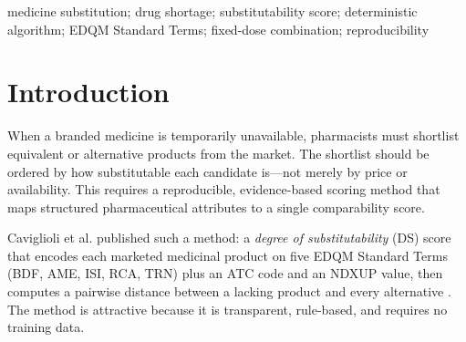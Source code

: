 \documentclass[a4paper]{elsarticle}
\begin{document}
{\begin{frontmatter}
\begin{abstract}
\textbf{Results.} The implementation reproduces 26/32 published Table 8 DS scores under the paper-as-printed mode; all six failures are parenteral injections off by exactly 1.2152. Under a proposed reconciliation---a transposition of two adjacent Table 1 rows (TRA-0039/TRA-0040) inferred from the published scores---all 32 scores reproduce within rounding (max error 0.0293, ranking identical). Table 7 cannot be reproduced under a single unit convention (unit-aware: 3/5; literal: 4/5). All 196 assertions pass; scoring scales linearly at about 11 microseconds per candidate (90 ms at 8192 candidates).

\textbf{Conclusions.} The implementation independently reproduces the available labelled examples of the published specification under a documented interpretation, with honest documentation of where the published tables are internally inconsistent. The fixed-dose-combination extension is explicitly labelled as our own preliminary adaptation and is unvalidated against published ground truth. No clinical interchangeability or therapeutic-equivalence claim is made. The implementation, test suite, and generated outputs are maintained in the authors' project directory; a public repository has not yet been released.
\end{abstract}

\begin{keyword}
medicine substitution; drug shortage; substitutability score; deterministic algorithm; EDQM Standard Terms; fixed-dose combination; reproducibility
\end{keyword}

\end{frontmatter}
}

\twocolumn

\section{Introduction}
\label{sec:intro}

When a branded medicine is temporarily unavailable, pharmacists must shortlist equivalent or alternative products from the market. The shortlist should be ordered by how substitutable each candidate is---not merely by price or availability. This requires a reproducible, evidence-based scoring method that maps structured pharmaceutical attributes to a single comparability score.

Caviglioli et al.\citep{caviglioli2025medicine} published such a method: a \emph{degree of substitutability} (DS) score that encodes each marketed medicinal product on five EDQM Standard Terms (BDF, AME, ISI, RCA, TRN) plus an ATC code and an NDXUP value, then computes a pairwise distance between a lacking product and every alternative \citep{caviglioli2025medicine}. The method is attractive because it is transparent, rule-based, and requires no training data.
\end{document}
